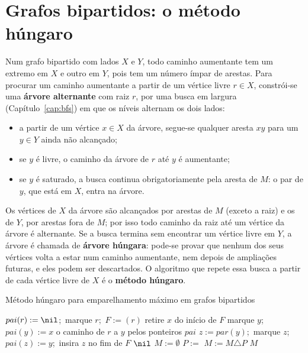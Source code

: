\section{Grafos bipartidos: o método húngaro}\label{sec:hungaro}
Num grafo bipartido com lados $X$ e $Y$, todo caminho aumentante tem um extremo em $X$ e outro em $Y$, pois tem um número ímpar de arestas. Para procurar um caminho aumentante a partir de um vértice livre $r\in X$, constrói-se uma \textbf{árvore alternante} com raiz $r$, por uma busca em largura (Capítulo~\ref{cap:bfs}) em que os níveis alternam os dois lados:
\begin{itemize}
  \item a partir de um vértice $x\in X$ da árvore, segue-se qualquer aresta $xy$ para um $y\in Y$ ainda não alcançado;
  \item se $y$ é livre, o caminho da árvore de $r$ até $y$ é aumentante;
  \item se $y$ é saturado, a busca continua obrigatoriamente pela aresta de $M$: o par de $y$, que está em $X$, entra na árvore.
\end{itemize}
Os vértices de $X$ da árvore são alcançados por arestas de $M$ (exceto a raiz) e os de $Y$, por arestas fora de $M$; por isso todo caminho da raiz até um vértice da árvore é alternante. Se a busca termina sem encontrar um vértice livre em $Y$, a árvore é chamada de \textbf{árvore húngara}: pode-se provar que nenhum dos seus vértices volta a estar num caminho aumentante, nem depois de ampliações futuras, e eles podem ser descartados. O algoritmo que repete essa busca a partir de cada vértice livre de $X$ é o \textbf{método húngaro}.
\begin{pseudo}{Método húngaro para emparelhamento máximo em grafos bipartidos}
\begin{algorithmic}
 
  \State $pai(r):=\nil$;\ marque $r$;\ $F:=(r)$
    \State retire $x$ do início de $F$
      \State marque $y$;\ $pai(y):=x$
       \State \Return o caminho de $r$ a $y$ pelos ponteiros $pai$  \EndIf
      \State $z:=par(y)$;\ marque $z$;\ $pai(z):=y$;\ insira $z$ no fim de $F$ 
    \EndFor
  \EndWhile
  \State \Return $\nil$ 
\EndFunction
{}
  \State $M:=\emptyset$
    \State $P:=$  
     \State $M:=M\triangle P$ \EndIf
  \EndFor
  \State \Return $M$
\EndFunction
\end{algorithmic}
\end{pseudo}
